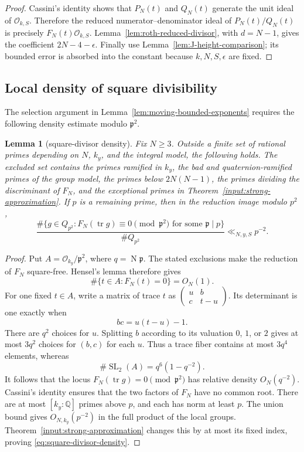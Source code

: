 \documentclass[11pt,reqno]{amsart}
\newtheorem{lemma}[theorem]{Lemma}
\theoremstyle{definition}
\theoremstyle{remark}
\newcommand{\Q}{\mathbb Q}
\newcommand{\cO}{\mathcal O}
\newcommand{\Tr}{\operatorname{tr}}
\newcommand{\SL}{\operatorname{SL}}
\newcommand{\Norm}{\operatorname{N}}
\begin{document}
\begin{proof}
Cassini's identity shows that \(P_N(t)\) and \(Q_N(t)\) generate the unit
ideal of \(\cO_{k,S}\).  Therefore the reduced numerator--denominator ideal of
\(P_N(t)/Q_N(t)\) is precisely
\(F_N(t)\cO_{k,S}\).  Lemma~\ref{lem:roth-reduced-divisor}, with
\(d=N-1\), gives the coefficient \(2N-4-\epsilon\).  Finally use
Lemma~\ref{lem:J-height-comparison}; its bounded error is absorbed into the
constant because \(k,N,S,\epsilon\) are fixed.
\end{proof}

\subsection{Local density of square divisibility}

The selection argument in Lemma~\ref{lem:moving-bounded-exponents} requires
the following density estimate modulo \(\mathfrak p^2\).

\begin{lemma}[square-divisor density]
\label{lem:square-divisor-density}
Fix \(N\ge3\).  Outside a finite set of rational primes depending on
\(N\), \(k_y\), and the integral model, the following holds.  The excluded
set contains the primes ramified in \(k_y\), the bad and quaternion-ramified
primes of the group model, the primes below \(2N(N-1)\), the primes dividing
the discriminant of \(F_N\), and the exceptional primes in
Theorem~\ref{input:strong-approximation}.  If
\(p\) is a remaining prime, then in the reduction image modulo \(p^2\),
\begin{equation}\label{eq:square-divisor-density}
 \frac{\#\{g\in Q_{p^2}:F_N(\Tr g)\equiv0\pmod{\mathfrak p^2}
                 \text{ for some }\mathfrak p\mid p\}}
      {\#Q_{p^2}}
 \ll_{N,y,S} p^{-2}.
\end{equation}
\end{lemma}

\begin{proof}
Put \(A=\cO_{k_y}/\mathfrak p^2\), where
\(q=\Norm\mathfrak p\).  The stated exclusions make the reduction of
\(F_N\) square-free.  Hensel's lemma therefore gives
\[
 \#\{t\in A:F_N(t)=0\}=O_N(1).
\]
For one fixed \(t\in A\), write a matrix of trace \(t\) as
\(\left(\begin{smallmatrix}u&b\\c&t-u\end{smallmatrix}\right)\).  Its
determinant is one exactly when
\[
 bc=u(t-u)-1.
\]
There are \(q^2\) choices for \(u\).  Splitting \(b\) according to its
valuation \(0\), \(1\), or \(2\) gives at most \(3q^2\) choices for \((b,c)\)
for each \(u\).  Thus a trace fiber contains at most \(3q^4\) elements,
whereas
\[
 \#\SL_2(A)=q^6(1-q^{-2}).
\]
It follows that the locus \(F_N(\Tr g)=0\pmod{\mathfrak p^2}\) has relative
density \(O_N(q^{-2})\).  Cassini's identity ensures that the two factors
of \(F_N\) have no common root.  There are at most \([k_y:\Q]\) primes
above \(p\), and each has norm at least \(p\).  The union bound gives
\(O_{N,k_y}(p^{-2})\) in the full product of the local groups.
Theorem~\ref{input:strong-approximation} changes this by at most its fixed
index, proving
\eqref{eq:square-divisor-density}.
\end{proof}
\end{document}
